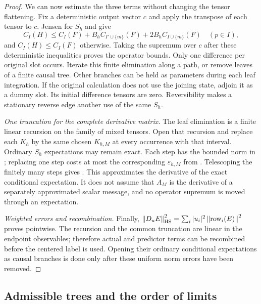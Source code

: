 \begin{proof}
We can now estimate the three terms without changing the tensor
flattening.  Fix a deterministic output vector $c$ and apply the
transpose of each tensor to $c$.  Jensen for $S_h$ and
 give
\begin{equation}
 C_I(H)\le C_I(F)+B_hC_{I'\cup\{m\}}(F)
                          +2B_hC_{I\cup\{m\}}(F)
 \quad(p\in I),
 \label{eq:path-copy-bound}
\end{equation}
and $C_I(H)\le C_I(F)$ otherwise.  Taking the supremum over $c$
after these deterministic inequalities proves the operator bounds.
Only one difference per original slot occurs.  Iterate this finite
elimination along a path, or remove leaves of a finite causal tree.
Other branches can be held as parameters during each leaf integration.
If the original calculation does not use the joining state, adjoin it
as a dummy slot.  Its initial difference tensors are zero.  Reversibility
makes a stationary reverse edge another use of the same $S_h$.

\emph{One truncation for the complete derivative matrix.}
The leaf elimination is a finite linear recursion on the family of mixed
tensors.  Open that recursion and replace each
$K_h$ by the same chosen $K_{h,M}$ at every occurrence with that
interval.  Ordinary $S_h$ expectations may remain exact.  Each step
has the bounded norm in ; replacing one step
costs at most the corresponding $\varepsilon_{h,M}$ from
.  Telescoping the finitely many steps
gives .  This approximates the derivative
of the exact conditional expectation.  It does not assume that $A_M$
is the derivative of a separately approximated scalar message, and
no operator supremum is moved through an expectation.

\emph{Weighted errors and recombination.}
Finally,
$\left\lVert D_uE\right\rVert_{\mathrm{HS}}^2=\sum_i|u_i|^2\left\lVert \operatorname{row}_i(E)\right\rVert^2$
proves  pointwise.  The recursion
and the common truncation are linear in the endpoint observables;
therefore actual and predictor terms can be recombined before the
centered label is used.  Opening their ordinary conditional expectations
as causal branches is done only after these uniform norm errors have
been removed.
\end{proof}

\subsection{Admissible trees and the order of limits}

